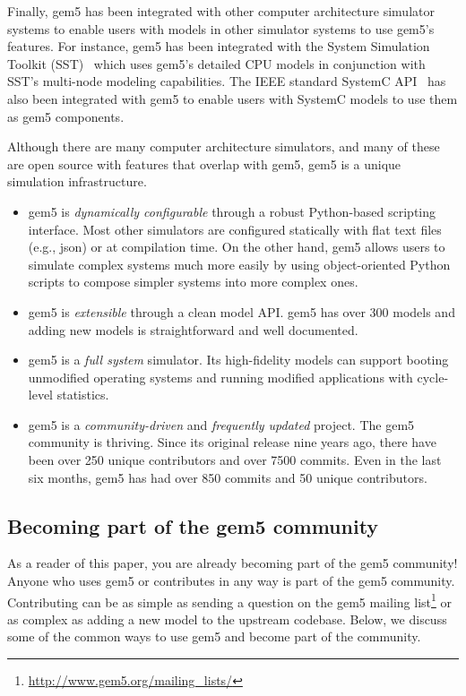 Finally, gem5 has been integrated with other computer architecture simulator systems to enable users with models in other simulator systems to use gem5's features.
For instance, gem5 has been integrated with the System Simulation Toolkit (SST)~\cite{} which uses gem5's detailed CPU models in conjunction with SST's multi-node modeling capabilities.
The IEEE standard SystemC API~\cite{} has also been integrated with gem5 to enable users with SystemC models to use them as gem5 components.

Although there are many computer architecture simulators, and many of these are open source with features that overlap with gem5, gem5 is a unique simulation infrastructure.
\begin{itemize}
    \item gem5 is \emph{dynamically configurable} through a robust Python-based scripting interface. Most other simulators are configured statically with flat text files (e.g., json) or at compilation time. On the other hand, gem5 allows users to simulate complex systems much more easily by using object-oriented Python scripts to compose simpler systems into more complex ones.
    \item gem5 is \emph{extensible} through a clean model API. gem5 has over 300 models and adding new models is straightforward and well documented.
    \item gem5 is a \emph{full system} simulator. Its high-fidelity models can support booting unmodified operating systems and running modified applications with cycle-level statistics.
    \item gem5 is a \emph{community-driven} and \emph{frequently updated} project. The gem5 community is thriving. Since its original release nine years ago, there have been over 250 unique contributors and over 7500 commits. Even in the last six months, gem5 has had over 850 commits and 50 unique contributors.
\end{itemize}

\subsection{Becoming part of the gem5 community}

As a reader of this paper, you are already becoming part of the gem5 community!
Anyone who uses gem5 or contributes in any way is part of the gem5 community.
Contributing can be as simple as sending a question on the gem5 mailing list\footnote{\url{http://www.gem5.org/mailing_lists/}} or as complex as adding a new model to the upstream codebase.
Below, we discuss some of the common ways to use gem5 and become part of the community.

